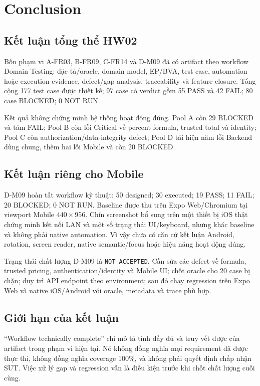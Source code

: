 \chapter{Conclusion}

\section{Kết luận tổng thể HW02}

Bốn phạm vi A-FR03, B-FR09, C-FR14 và D-M09 đã có artifact theo workflow
Domain Testing: đặc tả/oracle, domain model, EP/BVA, test case, automation hoặc
execution evidence, defect/gap analysis, traceability và feature closure.
Tổng cộng 177 test case được thiết kế; 97 case có verdict gồm 55 PASS và 42
FAIL; 80 case BLOCKED; 0 NOT RUN.

Kết quả không chứng minh hệ thống hoạt động đúng. Pool A còn 29 BLOCKED và tám
FAIL; Pool B còn lỗi Critical về percent formula, trusted total và identity;
Pool C còn authorization/data-integrity defect; Pool D tái hiện năm lỗi Backend
dùng chung, thêm hai lỗi Mobile và còn 20 BLOCKED.

\section{Kết luận riêng cho Mobile}

D-M09 hoàn tất workflow kỹ thuật: 50 designed; 30 executed; 19 PASS; 11 FAIL;
20 BLOCKED; 0 NOT RUN. Baseline được thu trên Expo Web/Chromium tại viewport
Mobile \(440 \times 956\). Chín screenshot bổ sung trên một thiết bị iOS thật
chứng minh kết nối LAN và một số trạng thái UI/keyboard, nhưng khác baseline và
không phải native automation. Vì vậy chưa có căn cứ kết luận Android, rotation,
screen reader, native semantic/focus hoặc hiệu năng hoạt động đúng.

Trạng thái chất lượng D-M09 là \texttt{NOT ACCEPTED}. Cần sửa các defect về
formula, trusted pricing, authentication/identity và Mobile UI; chốt oracle cho
20 case bị chặn; duy trì API endpoint theo environment; sau đó chạy regression
trên Expo Web và native iOS/Android với oracle, metadata và trace phù hợp.

\section{Giới hạn của kết luận}

“Workflow technically complete” chỉ mô tả tính đầy đủ và truy vết được của
artifact trong phạm vi hiện tại. Nó không đồng nghĩa mọi requirement đã được
thực thi, không đồng nghĩa coverage 100\%, và không phải quyết định chấp nhận
SUT. Việc xử lý gap và regression vẫn là điều kiện trước khi chốt
chất lượng cuối cùng.
